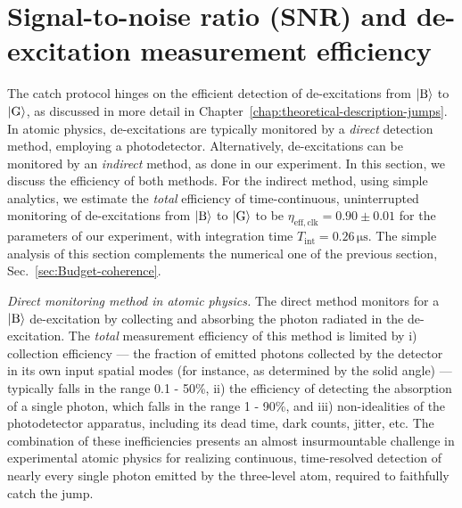 \section{Signal-to-noise ratio (SNR) and de-excitation measurement efficiency\label{subsec:Signal-to-noise-ratio-(SNR)}}

The catch protocol hinges on the efficient detection of de-excitations
from $|{\rm B}\rangle$ to $|{\rm G}\rangle$, as discussed in more
detail in Chapter~\ref{chap:theoretical-description-jumps}. In atomic
physics, de-excitations are typically monitored by a \emph{direct}
detection method, employing a photodetector. Alternatively, de-excitations
can be monitored by an\emph{ indirect} method, as done in our experiment.
In this section, we discuss the efficiency of both methods. For the
indirect method, using simple analytics, we estimate the \emph{total}
efficiency of time-continuous, uninterrupted monitoring of de-excitations
from $|{\rm B}\rangle$ to $|{\rm G}\rangle$ to be $\eta_{\mathrm{eff,clk}}=0.90\pm0.01$
for the parameters of our experiment, with integration time $T_{\mathrm{int}}=0.26\,\mathrm{\mu s}$.
The simple analysis of this section complements the numerical one
of the previous section, Sec.~\ref{sec:Budget-coherence}.

\emph{Direct monitoring method in atomic physics.} The direct method
monitors for a $|{\rm B}\rangle$ de-excitation by collecting and
absorbing the photon radiated in the de-excitation. The \emph{total}
measurement efficiency of this method is limited by i) collection
efficiency --- the fraction of emitted photons collected by the detector
in its own input spatial modes (for instance, as determined by the
solid angle) --- typically falls in the range 0.1 - 50\%, \citep{Volz2011}
ii) the efficiency of detecting the absorption of a single photon,
which falls in the range 1 - 90\%, \citep{Eisaman2011} and iii) non-idealities
of the photodetector apparatus, including its dead time, dark counts,
jitter, etc. \citep{Eisaman2011} The combination of these inefficiencies
presents an almost insurmountable challenge in experimental atomic
physics for realizing continuous, time-resolved detection of nearly
every single photon emitted by the three-level atom, required to faithfully
catch the jump. 

